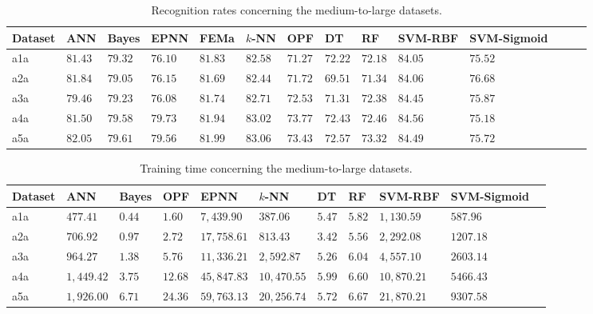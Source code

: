 \begin{table*}[!htb]
\begin{center}
\scriptsize
\caption{Recognition rates concerning the medium-to-large datasets.}
\label{tab.L_ACC}
\begin{tabular}{l|lllllllllllll}
Dataset & ANN     & Bayes   & EPNN    & FEMa    & $k$-NN  & OPF     &      DT  &      RF    &    SVM-RBF   & SVM-Sigmoid  \\ \hline \hline
a1a     & $81.43$ & $79.32$ & $76.10$ & $81.83$ & $82.58$ & $71.27$ & $72.22$  & $72.18$    & $\mathbf{84.05}$ &  $75.52$\\
a2a     & $81.84$ & $79.05$ & $76.15$ & $81.69$ & $82.44$ & $71.72$ & $69.51$  & $71.34$    & $\mathbf{84.06}$ &  $76.68$\\
a3a     & $79.46$ & $79.23$ & $76.08$ & $81.74$ & $82.71$ & $72.53$ & $71.31$  & $72.38$    & $\mathbf{84.45}$ &  $75.87$\\
a4a     & $81.50$ & $79.58$ & $79.73$ & $81.94$ & $83.02$ & $73.77$ & $72.43$  & $72.46$    &$\mathbf{84.56}$ &  $75.18$\\
a5a     & $82.05$ & $79.61$ & $79.56$ & $81.99$ & $83.06$ & $73.43$ & $72.57$  & $73.32$    &$\mathbf{84.49}$ &  $75.72$\\ \hline
\end{tabular}
\end{center}
\end{table*}




\begin{table*}[!htb]
\begin{center}
\caption{\label{tab.L_TR_TIME}Training time concerning the medium-to-large datasets.}
\scriptsize
\begin{tabular}{l||llllllllll}
Dataset & ANN     & Bayes  & OPF   & EPNN        & $k$-NN       &      DT  &  RF    & SVM-RBF & SVM-Sigmoid  \\ \hline \hline
a1a& $ 477.41$&   $ 0.44$& $ 1.60$ & $ 7,439.90$ & $ 387.06$    & $5.47$   & $5.82$ & $ 1,130.59$ & $587.96$ \\ 
a2a& $ 706.92$&   $ 0.97$& $ 2.72$ & $ 17,758.61$& $ 813.43$    & $3.42$   & $5.56$ & $ 2,292.08$ & $1207.18$\\ 
a3a& $ 964.27$&   $ 1.38$& $ 5.76$ & $ 11,336.21$& $ 2,592.87$  & $5.26$   & $6.04$ & $ 4,557.10$ & $2603.14$\\ 
a4a& $ 1,449.42$& $ 3.75$& $ 12.68$& $ 45,847.83$& $ 10,470.55$ & $5.99$   & $6.60$ & $ 10,870.21$& $5466.43$\\ 
a5a& $ 1,926.00$& $ 6.71$& $ 24.36$& $ 59,763.13$& $ 20,256.74$ & $5.72$   & $6.67$ & $ 21,870.21$& $9307.58$ \\ \hline
\end{tabular}
\end{center}
\end{table*}

